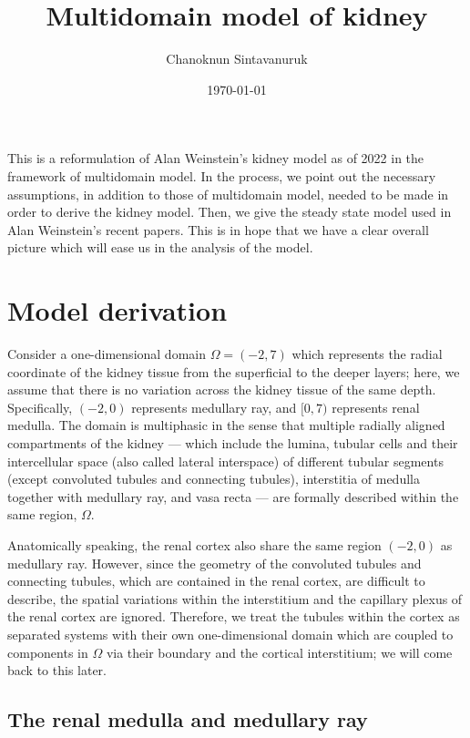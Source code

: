 \documentclass{article}
\title{Multidomain model of kidney}
\author[1]{Chanoknun Sintavanuruk}
\date{\today}
\begin{document}
\sloppy %
\maketitle

This is a reformulation of Alan Weinstein's kidney model as of 2022 in the framework of multidomain model.
In the process, we point out the necessary assumptions, in addition to those of multidomain model, needed to be made in order to derive the kidney model.
Then, we give the steady state model used in Alan Weinstein's recent papers.
This is in hope that we have a clear overall picture which will ease us in the analysis of the model.

\section{Model derivation}

Consider a one-dimensional domain $\Omega = (-2,7)$ which represents the radial coordinate of the kidney tissue from the superficial to the deeper layers; here, we assume that there is no variation across the kidney tissue of the same depth.
Specifically, $(-2,0)$ represents medullary ray, and $[0,7)$ represents renal medulla.
The domain is multiphasic in the sense that multiple radially aligned compartments of the kidney --- which include the lumina, tubular cells and their intercellular space (also called lateral interspace) of different tubular segments (except convoluted tubules and connecting tubules), interstitia of medulla together with medullary ray, and vasa recta --- are formally described within the same region, $\Omega$.

Anatomically speaking, the renal cortex also share the same region $(-2,0)$ as medullary ray.
However, since the geometry of the convoluted tubules and connecting tubules, which are contained in the renal cortex, are difficult to describe, the spatial variations within the interstitium and the capillary plexus of the renal cortex are ignored.
Therefore, we treat the tubules within the cortex as separated systems with their own one-dimensional domain which are coupled to components in $\Omega$ via their boundary and the cortical interstitium; we will come back to this later.

\subsection{The renal medulla and medullary ray}
\end{document}
